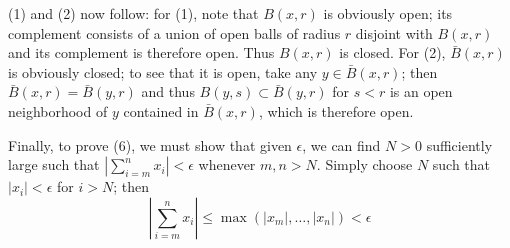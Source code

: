 \documentclass[12pt]{article}
\newcommand{\Abs}[1]{\left\lvert #1\right\rvert}
\begin{document}
(1) and (2) now follow: for (1), note that $B(x,r)$ is obviously open; its complement consists of a union of open balls of radius $r$ disjoint with $B(x,r)$ and its complement is therefore open. Thus $B(x,r)$ is closed. For (2), $\bar{B}(x,r)$ is obviously closed; to see that it is open, take any $y\in \bar{B}(x,r)$; then $\bar{B}(x,r)=\bar{B}(y,r)$ and thus $B(y,s)\subset \bar{B}(y,r)$ for $s<r$ is an open neighborhood of $y$ contained in $\bar{B}(x,r)$, which is therefore open.

Finally, to prove (6), we must show that given $\epsilon$, we can find $N>0$ sufficiently large such that $\Abs{\sum_{i=m}^n x_i}<\epsilon$ whenever $m,n>N$. Simply choose $N$ such that $\Abs{x_i}<\epsilon$ for $i>N$; then
\[\Abs{\sum_{i=m}^n x_i}\leq \max(\Abs{x_m},\ldots,\Abs{x_n}) < \epsilon\]
\end{document}
